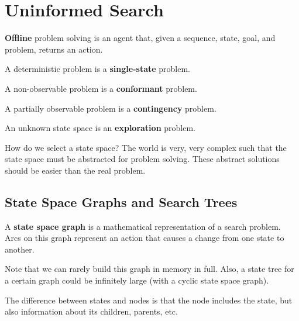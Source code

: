 
\section{Uninformed Search}

\begin{definition}
	\textbf{Offline} problem solving is an agent that, given a sequence, state, goal, and problem, returns an action.
\end{definition}

\begin{definition}
	A deterministic problem is a \textbf{single-state} problem.
\end{definition}

\begin{definition}
	A non-observable problem is a \textbf{conformant} problem.
\end{definition}

\begin{definition}
	A partially observable problem is a \textbf{contingency} problem.
\end{definition}

\begin{definition}
	An unknown state space is an \textbf{exploration} problem.
\end{definition}

How do we select a state space? The world is very, very complex such that the state space must be abstracted for problem solving. These abstract solutions should be easier than the real problem.

\subsection{State Space Graphs and Search Trees}

\begin{definition}
	A \textbf{state space graph} is a mathematical representation of a search problem. Arcs on this graph represent an action that causes a change from one state to another.
\end{definition}

Note that we can rarely build this graph in memory in full. Also, a state tree for a certain graph could be infinitely large (with a cyclic state space graph).

The difference between states and nodes is that the node includes the state, but also information about its children, parents, etc.


